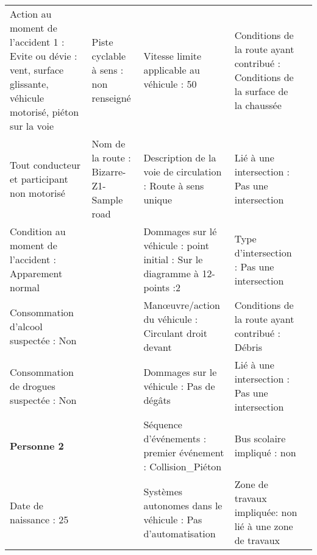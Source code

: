 \documentclass[a4paper,12pt,twoside,french]{book}
[a4paper,12pt,twoside]
\begin{document}
\begin{landscape}
\begin{table}[]
\begin{adjustbox}{width=2.1\textwidth,center=\textwidth}
\begin{tabular}{|l|l|l|l|l|}
Action au moment de l'accident 1 : Evite   ou dévie : vent, surface glissante, véhicule motorisé, piéton sur la voie & Piste cyclable à sens : non renseigné                       & Vitesse limite applicable au véhicule : 50                                          & Conditions de la route ayant contribué : Conditions de la surface de la   chaussée &  \\
{\color[HTML]{196B24} Tout conducteur et participant   non motorisé}                                                 & Nom de la route : Bizarre-Z1-Sample road                    & Description de la voie de circulation : Route à sens unique                         & Lié à une intersection : Pas une intersection                                      &  \\
Condition au moment de l'accident :   Apparement normal                                                              &                                                             & Dommages sur lé véhicule : point initial : Sur le diagramme à 12-points   :2        & Type d'intersection : Pas une intersection                                         &  \\
Consommation d'alcool suspectée : Non                                                                                &                                                             & Manœuvre/action du véhicule : Circulant droit devant                                & Conditions de la route ayant contribué : Débris                                    &  \\
Consommation de drogues suspectée : Non                                                                              &                                                             & Dommages sur le véhicule : Pas de dégâts                                            & Lié à une intersection : Pas une intersection                                      &  \\
\textbf{Personne 2}                                                                                                  &                                                             & Séquence d'événements : premier événement : Collision\_Piéton                       & Bus scolaire impliqué : non                                                        &  \\
Date de naissance : 25                                                                                               &                                                             & Systèmes autonomes dans le véhicule : Pas d'automatisation                          & Zone de travaux  impliquée: non lié   à une zone de travaux                        &  \\

\end{tabular}
\end{adjustbox}
\end{table}
\end{landscape}
\end{document}
